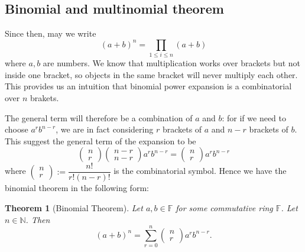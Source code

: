 \documentclass[12pt]{article}
\newtheorem*{theorem}{Theorem}
\begin{document}
    \subsection{Binomial and multinomial theorem}

    Since then, may we write \[(a+b)^n=\prod_{1\leq i\leq n}(a+b)\] where $a,b$ are numbers. We know that multiplication works over brackets but not inside one bracket, so objects in the same bracket will never multiply each other. This provides us an intuition that binomial power expansion is a combinatorial over $n$ brakets.
    
    The general term will therefore be a combination of $a$ and $b$: for if we need to choose $a^rb^{n-r}$, we are in fact considering $r$ brackets of $a$ and $n-r$ brackets of $b$. This suggest the general term of the expansion to be \[\begin{pmatrix}
        n\\r
    \end{pmatrix}\begin{pmatrix}
        n-r\\n-r
    \end{pmatrix}a^r b^{n-r}=\begin{pmatrix}
        n\\r
    \end{pmatrix}a^r b^{n-r}\] where $\begin{pmatrix}
        n\\r
    \end{pmatrix}:=\dfrac{n!}{r!(n-r)!}$ is the combinatorial symbol. Hence we have the binomial theorem in the following form:

    \begin{theorem}[Binomial Theorem]
        Let $a,b\in\mathbb{F}$ for some commutative ring $\mathbb{F}$. Let $n\in\mathbb{N}$. Then \[(a+b)^n=\sum_{r=0}^{n}\begin{pmatrix}
            n\\r
        \end{pmatrix}a^r b^{n-r}.\]
    \end{theorem}
\end{document}
